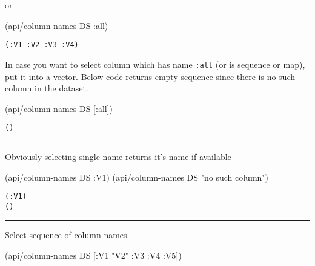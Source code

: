 \documentclass[]{article}
\newenvironment{Shaded}{\begin{snugshade}}{\end{snugshade}}
\newcommand{\StringTok}[1]{\textcolor[rgb]{0.31,0.60,0.02}{#1}}
\newcommand{\AttributeTok}[1]{\textcolor[rgb]{0.77,0.63,0.00}{#1}}
\newcommand{\NormalTok}[1]{#1}
\begin{document}
or

\begin{Shaded}
\begin{Highlighting}[]
\NormalTok{(api/column-names DS }\AttributeTok{:all}\NormalTok{)}
\end{Highlighting}
\end{Shaded}

\begin{verbatim}
(:V1 :V2 :V3 :V4)
\end{verbatim}

In case you want to select column which has name \texttt{:all} (or is
sequence or map), put it into a vector. Below code returns empty
sequence since there is no such column in the dataset.

\begin{Shaded}
\begin{Highlighting}[]
\NormalTok{(api/column-names DS [}\AttributeTok{:all}\NormalTok{])}
\end{Highlighting}
\end{Shaded}

\begin{verbatim}
()
\end{verbatim}

\begin{center}\rule{0.5\linewidth}{0.5pt}\end{center}

Obviously selecting single name returns it's name if available

\begin{Shaded}
\begin{Highlighting}[]
\NormalTok{(api/column-names DS }\AttributeTok{:V1}\NormalTok{)}
\NormalTok{(api/column-names DS }\StringTok{"no such column"}\NormalTok{)}
\end{Highlighting}
\end{Shaded}

\begin{verbatim}
(:V1)
()
\end{verbatim}

\begin{center}\rule{0.5\linewidth}{0.5pt}\end{center}

Select sequence of column names.

\begin{Shaded}
\begin{Highlighting}[]
\NormalTok{(api/column-names DS [}\AttributeTok{:V1} \StringTok{"V2"} \AttributeTok{:V3} \AttributeTok{:V4} \AttributeTok{:V5}\NormalTok{])}
\end{Highlighting}
\end{Shaded}
\end{document}
